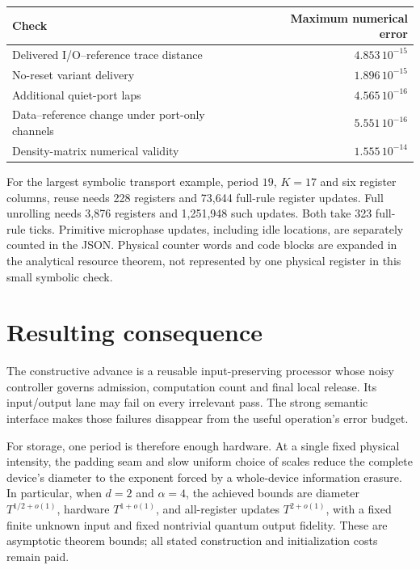 \documentclass[11pt]{article}
\begin{document}
\begin{center}
\begin{tabular}{lr}
\toprule
Check & Maximum numerical error\\
\midrule
Delivered I/O--reference trace distance & $4.853\,10^{-15}$\\
No-reset variant delivery & $1.896\,10^{-15}$\\
Additional quiet-port laps & $4.565\,10^{-16}$\\
Data--reference change under port-only channels & $5.551\,10^{-16}$\\
Density-matrix numerical validity & $1.555\,10^{-14}$\\
\bottomrule
\end{tabular}
\end{center}

For the largest symbolic transport example, period $19$, $K=17$ and
six register columns, reuse needs 228 registers and 73,644 full-rule
register updates. Full unrolling needs 3,876 registers and 1,251,948
such updates. Both take 323 full-rule ticks. Primitive microphase
updates, including idle locations, are separately counted in the JSON.
Physical counter words and code blocks are expanded in the analytical
resource theorem, not represented by one physical register in this
small symbolic check.

\section{Resulting consequence}

The constructive advance is a reusable input-preserving processor whose
noisy controller governs admission, computation count and final local
release. Its input/output lane may fail on every irrelevant pass.
The strong semantic interface makes those failures disappear from the
useful operation's error budget.

For storage, one period is therefore enough hardware. At a single fixed
physical intensity, the padding seam and slow uniform choice of scales
reduce the complete device's diameter to the exponent forced by a
whole-device information erasure. In particular, when $d=2$ and
$\alpha=4$, the achieved bounds are diameter $T^{1/2+o(1)}$, hardware
$T^{1+o(1)}$, and all-register updates $T^{2+o(1)}$, with a fixed
finite unknown input and fixed nontrivial quantum output fidelity.
These are asymptotic theorem bounds; all stated construction and
initialization costs remain paid.
\end{document}
